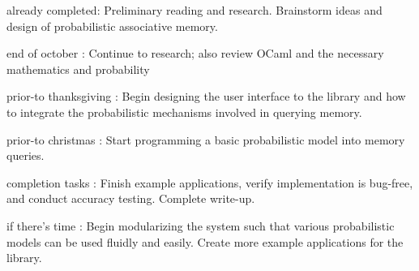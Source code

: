 \documentclass{sig-alternate}
\begin{document}
\begin{itemize*}
	\item {\sc already completed}: Preliminary reading and research. Brainstorm ideas and design of probabilistic associative memory. \vspace{3pt}
	\item {\sc end of october} : Continue to research; also review OCaml and the necessary mathematics and probability\vspace{3pt}
	\item {\sc prior-to thanksgiving} : Begin designing the user interface to the library and how to integrate the probabilistic mechanisms involved in querying memory.\vspace{3pt}
	\item {\sc prior-to christmas} : Start programming a basic probabilistic model into memory queries.\vspace{3pt}
	\item {\sc completion tasks} : Finish example applications, verify implementation is bug-free, and conduct accuracy testing. Complete write-up.\vspace{3pt}
	\item {\sc if there's time} : Begin modularizing the system such that various probabilistic models can be used fluidly and easily. Create more example applications for the library.
\end{itemize*}


\vspace{175pt}

\end{document}
